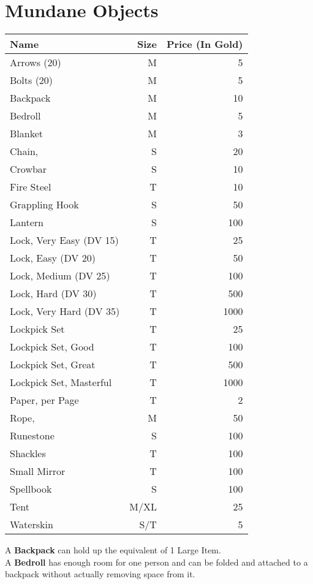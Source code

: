 \onecolumn
\section{Mundane Objects}\label{sec:mundaneObjects}
\begin{longtable}{l | r | r}
	Name & Size & Price (In Gold)\\ \hline
	Arrows (20) & M & 5\\
	Bolts (20) & M & 5\\
	Backpack & M & 10\\
	Bedroll & M & 5\\
	Blanket & M & 3\\
	Chain, \passus{2} & S & 20\\
	Crowbar & S & 10\\
	Fire Steel & T & 10\\
	Grappling Hook & S & 50\\
	Lantern & S & 100\\
	Lock, Very Easy (DV 15) & T & 25\\
	Lock, Easy (DV 20) & T & 50\\
	Lock, Medium (DV 25) & T & 100\\
	Lock, Hard (DV 30) & T & 500\\
	Lock, Very Hard (DV 35) & T & 1000\\
	Lockpick Set & T & 25\\
	Lockpick Set, Good & T & 100\\
	Lockpick Set, Great & T & 500\\
	Lockpick Set, Masterful & T & 1000\\
	Paper, per Page & T & 2\\
	Rope, \passus{10} & M & 50\\
	Runestone & S & 100\\
	Shackles & T & 100\\
	Small Mirror & T & 100\\
	Spellbook & S & 100\\
	Tent & M/XL & 25\\
	Waterskin & S/T & 5\\
\end{longtable}


A \textbf{Backpack} can hold up the equivalent of 1 Large Item.\\

A \textbf{Bedroll} has enough room for one person and can be folded and attached to a backpack without actually removing space from it.\\

